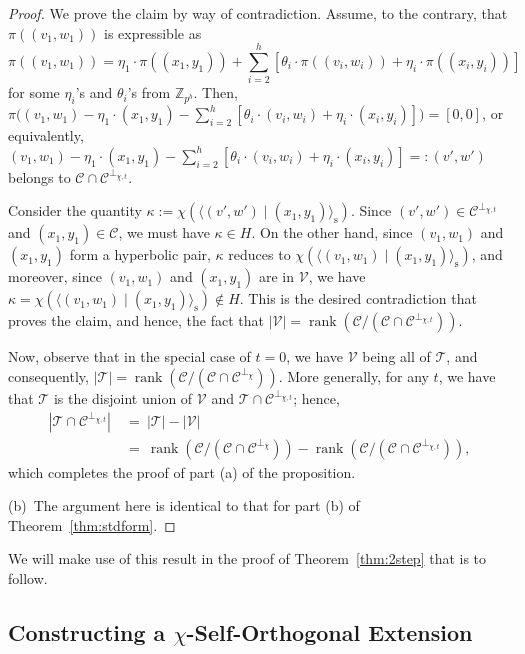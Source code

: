 \documentclass{article}
\DeclareMathOperator{\rank}{rank}
\theoremstyle{remark}
\theoremstyle{definition}
\numberwithin{equation}{section}
\begin{document}
\begin{proof}
We prove the claim by way of contradiction. Assume, to the contrary, that $\pi((v_1,w_1))$ is expressible as 
$$
\pi((v_1,w_1)) = \eta_1 \cdot \pi((x_1,y_1)) + \sum_{i=2}^h [\theta_i \cdot \pi((v_i,w_i)) + \eta_i \cdot \pi((x_i,y_i))]
$$
for some $\eta_i$'s and $\theta_i$'s from $\mathbb{Z}_{p^b}$. Then, $\pi\bigl((v_1,w_1) - \eta_1 \cdot (x_1,y_1) - \sum_{i=2}^h [\theta_i \cdot (v_i,w_i) + \eta_i \cdot (x_i,y_i)]\bigr) = [0,0]$, or equivalently, $(v_1,w_1) - \eta_1 \cdot (x_1,y_1) - \sum_{i=2}^h [\theta_i \cdot (v_i,w_i) + \eta_i \cdot (x_i,y_i)] =: (v',w')$ belongs to $\mathcal{C} \cap \mathcal{C}^{\perp_{\chi,t}}$.

Consider the quantity $\kappa := \chi( \langle (v',w') \mid (x_1,y_1) \rangle_{\mathrm{s}})$. Since $(v',w') \in \mathcal{C}^{\perp_{\chi,t}}$ and $(x_1,y_1) \in \mathcal{C}$, we must have $\kappa \in H$. On the other hand, 
since $(v_1,w_1)$ and $(x_1,y_1)$ form a hyperbolic pair,  $\kappa$ reduces to $\chi( \langle (v_1,w_1) \mid (x_1,y_1) \rangle_{\mathrm{s}})$, and moreover, since $(v_1,w_1)$ and $(x_1,y_1)$ are in $\mathcal{V}$, we have $\kappa = \chi( \langle (v_1,w_1) \mid (x_1,y_1) \rangle_{\mathrm{s}}) \notin H$. This is the desired contradiction that proves the claim, and hence, the fact that $|\mathcal{V}| = \rank(\mathcal{C} / (\mathcal{C} \cap \mathcal{C}^{\perp_{\chi,t}}))$.

Now, observe that in the special case of $t = 0$, we have $\mathcal{V}$ being all of $\mathcal{T}$, and consequently, $\left|\mathcal{T}\right| = \rank(\mathcal{C} / (\mathcal{C} \cap \mathcal{C}^{\perp_{\chi}}))$. More generally, for any $t$, we have that $\mathcal{T}$ is the disjoint union of $\mathcal{V}$ and $\mathcal{T} \cap \mathcal{C}^{\perp_{\chi,t}}$; hence, 
\begin{align*}
\left|\mathcal{T} \cap \mathcal{C}^{\perp_{\chi,t}}\right| \ &= \ \left|\mathcal{T}\right| - |\mathcal{V}| \\
&= \ \rank(\mathcal{C} / (\mathcal{C} \cap \mathcal{C}^{\perp_{\chi}})) - \rank(\mathcal{C} / (\mathcal{C} \cap \mathcal{C}^{\perp_{\chi,t}})),
\end{align*}
which completes the proof of part (a) of the proposition.

(b)\ The argument here is identical to that for part (b) of Theorem~\ref{thm:stdform}.
\end{proof}

We will make use of this result in the proof of Theorem~\ref{thm:2step} that is to follow.

\subsection{Constructing a $\chi$-Self-Orthogonal Extension} \label{sec:chi-self-ortho}
 
\end{document}
